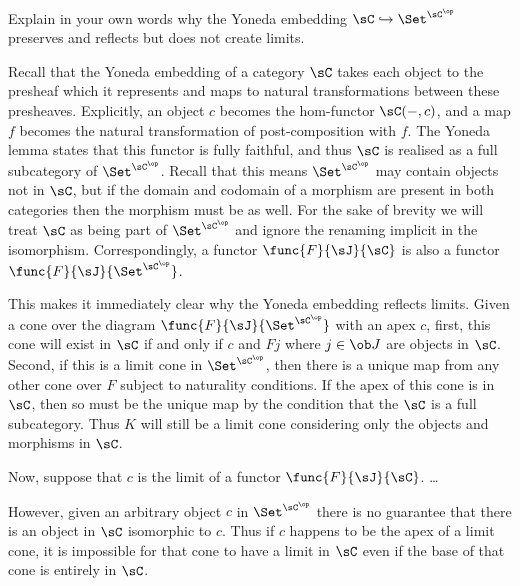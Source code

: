 \documentclass[main.tex]{subfiles}
\begin{document}
\paragraph{}
\begin{exercise}
	Explain in your own words why the Yoneda embedding
	\({\sC}\hookrightarrow{\Set^{\sC^\op}}\) preserves and reflects but does not
	create limits.
\end{exercise}

Recall that the Yoneda embedding of a category \(\sC\) takes each object to the
presheaf which it represents and maps to natural transformations between these
presheaves. Explicitly, an object \(c\) becomes the hom-functor \(\sC(-,c)\),
and a map \(f\) becomes the natural transformation of post-composition with
\(f\). The Yoneda lemma states that this functor is fully faithful, and thus
\(\sC\) is realised as a full subcategory of \(\Set^{\sC^\op}\). Recall that
this means \(\Set^{\sC^\op}\) may contain objects not in \(\sC\), but if the
domain and codomain of a morphism are present in both categories then the
morphism must be as well. For the sake of brevity we will treat \(\sC\) as being
part of \(\Set^{\sC^\op}\) and ignore the renaming implicit in the isomorphism.
Correspondingly, a functor \(\func{F}{\sJ}{\sC}\) is also a functor
\(\func{F}{\sJ}{\Set^{\sC^\op}}\).

This makes it immediately clear why the Yoneda embedding reflects limits. Given
a cone over the diagram \(\func{F}{\sJ}{\Set^{\sC^\op}}\) with an apex
\(c\), first, this cone will exist in \(\sC\) if and only if \(c\) and \(Fj\)
where \(j\in\ob J\) are objects in \(\sC\). Second, if this is a limit cone in
\(\Set^{\sC^\op}\), then there is a unique map from any other cone over \(F\)
subject to naturality conditions. If the apex of this cone is in \(\sC\), then
so must be the unique map by the condition that the \(\sC\) is a full
subcategory. Thus \(K\) will still be a limit cone considering only the objects
and morphisms in \(\sC\).

Now, suppose that \(c\) is the limit of a functor \(\func{F}{\sJ}{\sC}\). \dots

However, given an arbitrary object \(c\) in \(\Set^{\sC^\op}\) there is no
guarantee that there is an object in \(\sC\) isomorphic to \(c\). Thus if \(c\)
happens to be the apex of a limit cone, it is impossible for that cone to have a
limit in \(\sC\) even if the base of that cone is entirely in \(\sC\).
\end{document}
